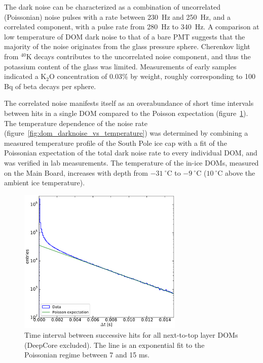 The dark noise can be characterized as a combination of uncorrelated
(Poissonian) noise pulses with a rate between \SI{230}{\hertz} and
\SI{250}{\hertz}, and a correlated component, with a pulse rate from
\SI{280}{\hertz} to \SI{340}{\hertz}.  A comparison at low temperature of
DOM dark noise to that of a bare PMT suggests that the majority of the
noise originates from the glass pressure sphere.  Cherenkov light from
$^{40}\mathrm{K}$ decays contributes to the uncorrelated noise component,
and thus the potassium content of the glass was limited.
Measurements of early samples indicated a $\mathrm{K}_2\mathrm{O}$
concentration of 0.03\% by weight, roughly corresponding to 100 Bq of beta
decays per sphere. 

The correlated noise manifests itself as an overabundance of short time
intervals between hits in a single DOM compared to the Poisson expectation
(figure~\ref{fig:darknoise_deltaT}). 
The temperature dependence of the noise rate
(figure~\ref{fig:dom_darknoise_vs_temperature}) was determined by combining a
measured temperature profile of 
the South Pole ice cap \cite{price2002temperature} with a fit of the
Poissonian expectation of the total dark noise rate to every individual
DOM, and was verified in lab measurements.  The temperature of the in-ice
DOMs, measured on the Main Board, increases with depth from
$-31\ ^{\circ}\mathrm{C}$ to $-9\ ^{\circ}\mathrm{C}$
($10\ ^{\circ}\mathrm{C}$ above the ambient ice temperature). 

\begin{figure}
  \centering
  \includegraphics[width=0.7\textwidth]{graphics/dom/performance/darknoise/DarkNoise_Layer2Doms.pdf}
 \caption{Time interval between successive hits for all next-to-top layer
   DOMs (DeepCore excluded).  The line is an exponential fit to the
   Poissonian regime between 7 and 15 ms.}
 \label{fig:darknoise_deltaT}
\end{figure}

